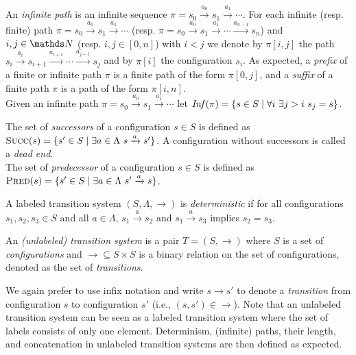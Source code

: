 An {\em infinite path} is an infinite sequence
 $\pi = s_0 \xrightarrow{a_0 } s_1 \xrightarrow{a_1 } \cdots $.
For each infinite (resp. finite) path  $\pi = s_0 \xrightarrow{a_0 } s_1 \xrightarrow{a_1 } \cdots$ 
(resp. $\pi = s_0 \xrightarrow{a_0 } s_1 \xrightarrow{a_1 } \cdots \xrightarrow{a_{n-1}} s_n$)
and $i,j \in \N$ (resp. $i,j \in [0,n]$) with $i<j$ we denote
by $\pi[i,j]$ the path 
$s_i  \xrightarrow{a_i } s_{i+1}  \xrightarrow{a_{i+1} } \cdots  \xrightarrow{a_{j-1} } s_j$
 and by $\pi[i]$ the configuration $s_i$.
As expected, a {\em prefix} of a finite or infinite path $\pi$ is a finite path of the form $\pi[0,j]$, and
a  {\em suffix} of a finite path $\pi$ is a path of the form $\pi[i,n]$.  \\
Given an infinite path $\pi = s_0 \xrightarrow{a_0 } s_1 \xrightarrow{a_1 } \cdots$ let
$\text{\textit{Inf}}(\pi) = \{ s \in S \mid \forall i ~ \exists j > i ~ s_j = s\}$.

\newcommand{\pred}{\textsc{Pred}}
\renewcommand{\succ}{\textsc{Succ}}

\noindent
The set of {\em successors} of a configuration $s \in S$ is deﬁned as
$\succ(s) = \{ s' \in S \mid \exists a \in \Lambda ~ s \xrightarrow{a} s'\}$.
A configuration without successors is called a {\em dead end}.  \\
The set of {\em predecessor} of a configuration $s \in S$ is deﬁned as
$\pred(s) = \{ s' \in S \mid \exists a \in \Lambda ~ s' \xrightarrow{a} s\}$.



A labeled transition system $(S, \Lambda, \rightarrow)$ is {\em deterministic} if for all configurations $s_1, s_2, s_3 \in S$ and all
$a \in \Lambda$,
 $ s_1  \xrightarrow{a} s_{2}$ and  
 $s_1  \xrightarrow{a} s_{3} $ implies $s_2 = s_3 $. \\



\begin{definition}
An {\em (unlabeled) transition system} is a pair $T = (S,\rightarrow )$ where $S$ is a set of 
{\em configurations} and  
$ {\rightarrow} \subseteq S \times S$ is a
binary relation 
on
the set of configurations, denoted as the set of {\em transitions}. 
\end{definition}

We again prefer to use infix notation and write $s \rightarrow s'$ to denote a {\em transition} from configuration $s$ to configuration $s'$ (i.e., $ (s,s') \in  {\rightarrow} $). \newline
Note 
 that an unlabeled transition system can be seen as a labeled transition system where the set of labels consists of only one element. 
Determinism, (infinite) paths, their length, and concatenation in unlabeled transition systems are
then defined as expected.

